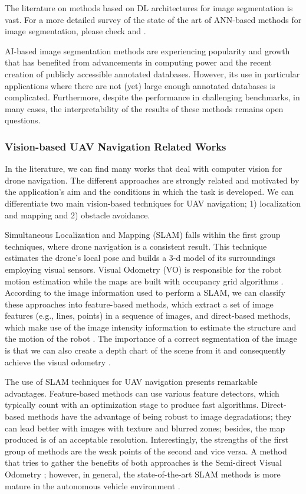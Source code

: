 The literature on methods based on DL architectures for image segmentation is vast. For a more detailed survey of the state of the art of ANN-based methods for image segmentation, please check \citep{Sultana.Sufian.ea:KBS:2020} and \citep{Minaee.Boykov.ea:PAMI:2021}.

AI-based image segmentation methods are experiencing popularity and growth that has benefited from advancements in computing power and the recent creation of publicly accessible annotated databases. However, its use in particular applications where there are not (yet) large enough annotated databases is complicated. Furthermore, despite the performance in challenging benchmarks, in many cases, the interpretability of the results of these methods remains open questions.

\subsubsection*{Vision-based UAV Navigation Related Works}
In the literature, we can find many works that deal with computer vision for drone navigation. The different approaches are strongly related and motivated by the application's aim and the conditions in which the task is developed. We can differentiate two main vision-based techniques for UAV navigation; 1) localization and mapping and 2) obstacle avoidance.

Simultaneous Localization and Mapping (SLAM) falls within the first group techniques, where drone navigation is a consistent result. This technique estimates the drone's local pose and builds a 3-d model of its surroundings employing visual sensors. Visual Odometry (VO) \citep{Scaramuzza.Fraundorfer:RAM:2011} is responsible for the robot motion estimation while the maps are built with occupancy grid algorithms \citep{Thrun.Bu:AI:1996}. According to the image information used to perform a SLAM, we can classify these approaches into feature-based methods, which extract a set of image features (e.g., lines, points) in a sequence of images, and direct-based methods, which make use of the image intensity information to estimate the structure and the motion of the robot \citep{Taketomi.Uchiyama.ea:TCVA:2017}. The importance of a correct segmentation of the image is that we can also create a depth chart of the scene from it and consequently achieve the visual odometry \citep{Drouyer:Thesis:2017, Drouyer.Beucher.ea:MMASP:2017}. 

The use of SLAM techniques for UAV navigation presents remarkable advantages. Feature-based methods can use various feature detectors, which typically count with an optimization stage to produce fast algorithms. Direct-based methods have the advantage of being robust to image degradations; they can lead better with images with texture and blurred zones; besides, the map produced is of an acceptable resolution. Interestingly, the strengths of the first group of methods are the weak points of the second and vice versa. A method that tries to gather the benefits of both approaches is the Semi-direct Visual Odometry \citep{Forster.Pizzoli.ea:ICRA:2014}; however, in general, the state-of-the-art SLAM methods is more mature in the autonomous vehicle environment \citep{Singandhupe.La:IRC:2019}.

